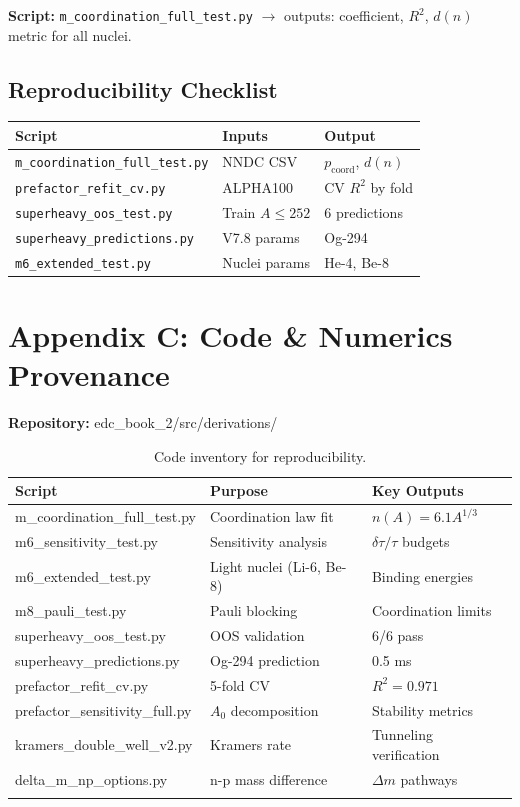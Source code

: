 \documentclass[11pt,a4paper]{article}
\begin{document}
\textbf{Script:} \texttt{m\_coordination\_full\_test.py} $\to$ outputs: coefficient, $R^2$, $d(n)$ metric for all nuclei.

\subsection{Reproducibility Checklist}

\begin{tabular}{p{4.5cm}p{3.5cm}p{4.5cm}}
\toprule
\textbf{Script} & \textbf{Inputs} & \textbf{Output} \\
\midrule
\texttt{m\_coordination\_full\_test.py} & NNDC CSV & $p_{\mathrm{coord}}$, $d(n)$ \\
\texttt{prefactor\_refit\_cv.py} & ALPHA100 & CV $R^2$ by fold \\
\texttt{superheavy\_oos\_test.py} & Train $A \leq 252$ & 6 predictions \\
\texttt{superheavy\_predictions.py} & V7.8 params & Og-294 \\
\texttt{m6\_extended\_test.py} & Nuclei params & He-4, Be-8 \\
\bottomrule
\end{tabular}

\section{Appendix C: Code \& Numerics Provenance}
\label{app:code}

\textbf{Repository:} edc\_book\_2/src/derivations/

\begin{longtable}{p{5cm}p{6cm}p{3cm}}
\toprule
\textbf{Script} & \textbf{Purpose} & \textbf{Key Outputs} \\
\midrule
\endhead
m\_coordination\_full\_test.py & Coordination law fit & $n(A) = 6.1 A^{1/3}$ \\
m6\_sensitivity\_test.py & Sensitivity analysis & $\delta\tau/\tau$ budgets \\
m6\_extended\_test.py & Light nuclei (Li-6, Be-8) & Binding energies \\
m8\_pauli\_test.py & Pauli blocking & Coordination limits \\
superheavy\_oos\_test.py & OOS validation & 6/6 pass \\
superheavy\_predictions.py & Og-294 prediction & 0.5 ms \\
prefactor\_refit\_cv.py & 5-fold CV & $R^2 = 0.971$ \\
prefactor\_sensitivity\_full.py & $A_0$ decomposition & Stability metrics \\
kramers\_double\_well\_v2.py & Kramers rate & Tunneling verification \\
delta\_m\_np\_options.py & n-p mass difference & $\Delta m$ pathways \\
\bottomrule
\caption{Code inventory for reproducibility.}
\end{longtable}
\end{document}
